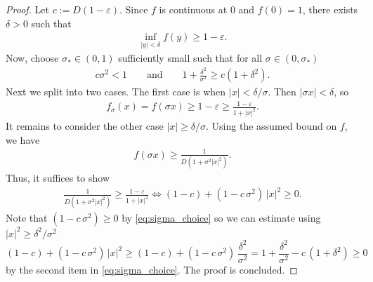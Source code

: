 \documentclass[10pt,a4paper]{amsart}
\begin{document}
\begin{proof}
    Let $c := D(1-\varepsilon)$. Since $f$ is continuous at $0$ and $f(0)=1$, there exists $\delta > 0$ such that
    \begin{align*}
        \inf_{|y|< \delta}f(y) \geq 1 - \varepsilon.
    \end{align*}
    Now, choose $\sigma_\ast \in (0,1)$ sufficiently small such that for all $\sigma \in (0,\sigma_\ast)$
    \begin{align}
        \label{eq:sigma_choice}
        c \sigma^2 < 1
        \qquad \text{and}\qquad1 + \frac{\delta^2}{\sigma^2} \geq c(1+\delta^2).
    \end{align}
    Next we split into two cases. The first case is when $|x| < \delta/\sigma$. Then $|\sigma x| < \delta$, so
    \begin{align*}
        f_\sigma(x)=f(\sigma x) \geq 1 - \varepsilon
        \geq \frac{1-\varepsilon}{1+|x|^2}.
    \end{align*}
    It remains to consider the other case $|x| \geq \delta/\sigma$. Using the assumed bound on $f$, we have
    \begin{align*}
        f(\sigma x) \geq \frac{1}{D(1+\sigma^2|x|^2)}.
    \end{align*}
    Thus, it suffices to show
    \begin{align*}
        \frac{1}{D(1+\sigma^2|x|^2)} \geq \frac{1-\varepsilon}{1+|x|^2} \iff (1-c) + (1-c\,\sigma^2)\,|x|^2 \geq 0.
    \end{align*}
    Note that $(1-c\,\sigma^2) \geq 0$ by \eqref{eq:sigma_choice} so we can estimate using $|x|^2 \geq \delta^2/\sigma^2$
    $$
    (1-c) + (1-c\,\sigma^2)\,|x|^2 \geq (1-c) + (1-c\,\sigma^2)\,\frac{\delta^2}{\sigma^2}  = 1 + \frac{\delta^2}{\sigma^2} - c\,(1+\delta^2)\geq 0
    $$
    by the second item in \eqref{eq:sigma_choice}. The proof is concluded.
\end{proof}
\end{document}
